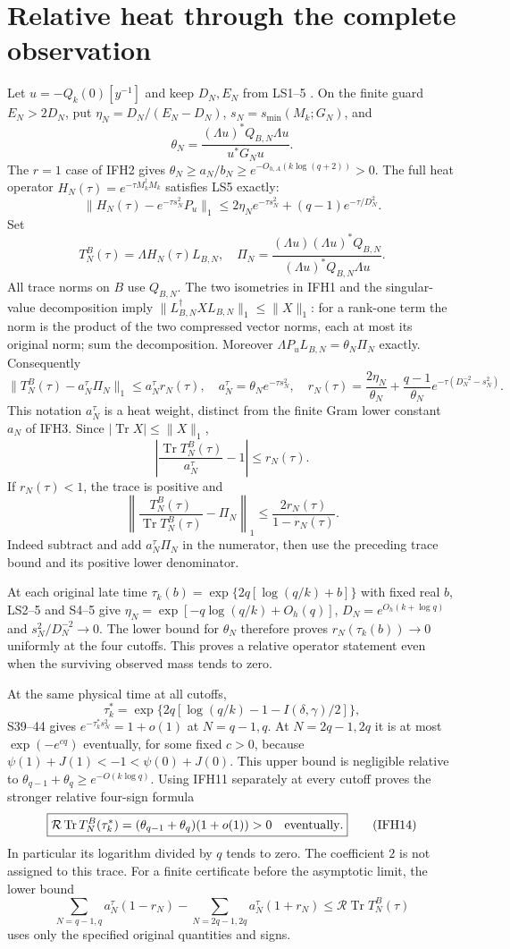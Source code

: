 \documentclass[11pt]{article}
\begin{document}
\section{Relative heat through the complete observation}
Let $u=-Q_k(0)[y^{-1}]$ and keep $D_N,E_N$ from LS1--5 \cite{LS}.
On the finite guard $E_N>2D_N$, put
$\eta_N=D_N/(E_N-D_N)$, $s_N=s_{\min}(M_k;G_N)$, and
\[
\theta_N=\frac{(\Lambda u)^*Q_{B,N}\Lambda u}{u^*G_Nu}.
\]
The $r=1$ case of IFH2 gives
$\theta_N\ge a_N/b_N\ge e^{-O_{h,A}(k\log(q+2))}>0$.
The full heat operator $H_N(\tau)=e^{-\tau M_k^\dagger M_k}$
satisfies LS5 exactly:
\[
\|H_N(\tau)-e^{-\tau s_N^2}P_u\|_1
\le2\eta_Ne^{-\tau s_N^2}+(q-1)e^{-\tau/D_N^2}.
\]
Set
\[
T_N^B(\tau)=\Lambda H_N(\tau)L_{B,N},\quad
\Pi_N=\frac{(\Lambda u)(\Lambda u)^*Q_{B,N}}
             {(\Lambda u)^*Q_{B,N}\Lambda u}.
\]
All trace norms on $B$ use $Q_{B,N}$. The two isometries in IFH1
and the singular-value decomposition imply
$\|L_{B,N}^\dagger X L_{B,N}\|_1\le\|X\|_1$:
for a rank-one term the norm is the product of the two compressed
vector norms, each at most its original norm; sum the decomposition.
Moreover $\Lambda P_uL_{B,N}=\theta_N\Pi_N$ exactly.
Consequently
\[
\|T_N^B(\tau)-a_N^\tau\Pi_N\|_1
\le a_N^\tau r_N(\tau),\quad
a_N^\tau=\theta_Ne^{-\tau s_N^2},\quad
r_N(\tau)=\frac{2\eta_N}{\theta_N}
+\frac{q-1}{\theta_N}
e^{-\tau(D_N^{-2}-s_N^2)} .
\tag{IFH11}
\]
This notation $a_N^\tau$ is a heat weight, distinct from the
finite Gram lower constant $a_N$ of IFH3.
Since $|\operatorname{Tr}X|\le\|X\|_1$,
\[
\left|\frac{\operatorname{Tr}T_N^B(\tau)}{a_N^\tau}-1\right|
\le r_N(\tau).
\]
If $r_N(\tau)<1$, the trace is positive and
\[
\left\|\frac{T_N^B(\tau)}{\operatorname{Tr}T_N^B(\tau)}
                  -\Pi_N\right\|_1
\le\frac{2r_N(\tau)}{1-r_N(\tau)} .
\tag{IFH12}
\]
Indeed subtract and add $a_N^\tau\Pi_N$ in the numerator, then
use the preceding trace bound and its positive lower denominator.

At each original late time
$\tau_k(b)=\exp\{2q[\log(q/k)+b]\}$ with fixed real $b$,
LS2--5 and S4--5 give
$\eta_N=\exp[-q\log(q/k)+O_h(q)]$,
$D_N=e^{O_h(k+\log q)}$ and $s_N^2/D_N^{-2}\to0$.
The lower bound for $\theta_N$ therefore proves $r_N(\tau_k(b))\to0$
uniformly at the four cutoffs. This proves a relative operator
statement even when the surviving observed mass tends to zero.

At the same physical time at all cutoffs,
\[
\tau_k^*=\exp\{2q[\log(q/k)-1-I(\delta,\gamma)/2]\},
\tag{IFH13}
\]
S39--44 gives $e^{-\tau_k^*s_N^2}=1+o(1)$ at $N=q-1,q$.
At $N=2q-1,2q$ it is at most $\exp(-e^{c q})$ eventually,
for some fixed $c>0$, because
$\psi(1)+J(1)<-1<\psi(0)+J(0)$.
This upper bound is negligible relative to
$\theta_{q-1}+\theta_q\ge e^{-O(k\log q)}$.
Using IFH11 separately at every cutoff proves the stronger relative
four-sign formula
\[
\boxed{\mathcal R\operatorname{Tr}T_N^B(\tau_k^*)
=(\theta_{q-1}+\theta_q)(1+o(1))>0
\quad\hbox{eventually}.}
\tag{IFH14}
\]
In particular its logarithm divided by $q$ tends to zero.
The coefficient $2$ is not assigned to this trace.
For a finite certificate before the asymptotic limit, the lower bound
\[
\sum_{N=q-1,q}a_N^\tau(1-r_N)
-\sum_{N=2q-1,2q}a_N^\tau(1+r_N)
\le\mathcal R\operatorname{Tr}T_N^B(\tau)
\tag{IFH15}
\]
uses only the specified original quantities and signs.
\end{document}
